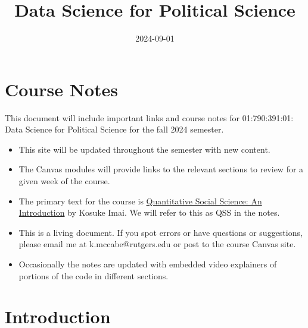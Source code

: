 \documentclass[
  letterpaper,
  DIV=11,
  numbers=noendperiod]{scrreprt}
\title{Data Science for Political Science}
\author{}
\date{2024-09-01}
\renewcommand*\contentsname{Table of contents}
\newcommand\contentsname{Table of contents}
\begin{document}
\maketitle
\ifdefined\Shaded\renewenvironment{Shaded}{\begin{tcolorbox}[sharp corners, breakable, boxrule=0pt, interior hidden, frame hidden, enhanced, borderline west={3pt}{0pt}{shadecolor}]}{\end{tcolorbox}}\fi

\renewcommand*\contentsname{Section Contents}
{
\hypersetup{linkcolor=}
\setcounter{tocdepth}{3}
\tableofcontents
}

\hypertarget{course-notes}{%
\chapter*{Course Notes}\label{course-notes}}


This document will include important links and course notes for
01:790:391:01: Data Science for Political Science for the fall 2024
semester.

\begin{itemize}
\item
  This site will be updated throughout the semester with new content.
\item
  The Canvas modules will provide links to the relevant sections to
  review for a given week of the course.
\item
  The primary text for the course is
  \href{https://qss.princeton.press/qss-an-introduction/}{Quantitative
  Social Science: An Introduction} by Kosuke Imai. We will refer to this
  as QSS in the notes.
\item
  This is a living document. If you spot errors or have questions or
  suggestions, please email me at k.mccabe@rutgers.edu or post to the
  course Canvas site.
\item
  Occasionally the notes are updated with embedded video explainers of
  portions of the code in different sections.
\end{itemize}


\hypertarget{introduction}{%
\chapter{Introduction}\label{introduction}}
\end{document}

